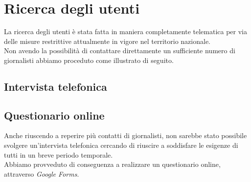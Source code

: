 \section{Ricerca degli utenti}
\label{s:ricerca-utenti}
La ricerca degli utenti è stata fatta in maniera completamente telematica per via delle misure restrittive attualmente in vigore nel territorio nazionale.\\
Non avendo la possibilità di contattare direttamente un sufficiente numero di giornalisti abbiamo proceduto come illustrato di seguito.

\subsection{Intervista telefonica}
\label{ss:intervista-telefonica}


\subsection{Questionario online}
\label{ss:questionario-online}
Anche riuscendo a reperire più contatti di giornalisti, non sarebbe stato possibile svolgere un'intervista telefonica cercando di riuscire a soddisfare le esigenze di tutti in un breve periodo temporale.\\
Abbiamo provveduto di conseguenza a realizzare un questionario online, attraverso \textit{Google Forms}.

